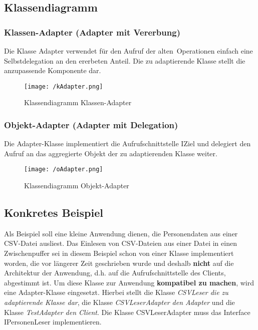 \documentclass[12pt,a4paper,titlepage]{article}
\theoremstyle{definition}
\begin{document}
\subsection{Klassendiagramm}
\subsubsection{Klassen-Adapter (Adapter mit Vererbung)}
Die Klasse Adapter verwendet für den Aufruf der \glqq alten\grqq ~Operationen einfach eine Selbstdelegation an den ererbeten Anteil.
Die zu adaptierende Klasse stellt die anzupassende Komponente dar.
\begin{figure}[htbp]
	\begin{center}
	\texttt{[image: /kAdapter.png]}
	
	\caption{Klassendiagramm Klassen-Adapter}
	\label{default}
	\end{center}
\end{figure}
\subsubsection{Objekt-Adapter (Adapter mit Delegation)}
Die Adapter-Klasse implementiert die Aufrufschnittstelle IZiel und delegiert den Aufruf an das 
aggregierte Objekt der zu adaptierenden Klasse weiter.
\begin{figure}[htbp]
	\begin{center}
	\texttt{[image: /oAdapter.png]}
	
	\caption{Klassendiagramm Objekt-Adapter}
	\label{default}
	\end{center}
\end{figure}

\subsection{Konkretes Beispiel}
Als Beispiel soll eine kleine Anwendung dienen, die Personendaten aus einer CSV-Datei ausliest.
Das Einlesen von CSV-Dateien aus einer Datei in einen Zwischenpuffer sei in diesem Beispiel schon von einer
Klasse implementiert worden, die vor längerer Zeit geschrieben wurde und deshalb \textbf{nicht} 
auf die Architektur der Anwendung, d.h. auf die Aufrufschnittstelle des Clients, abgestimmt ist.
Um diese Klasse zur Anwendung \textbf{kompatibel zu machen}, wird eine Adapter-Klasse eingesetzt.
\newline
\newline
Hierbei stellt die Klasse \textit{CSVLeser die zu adaptierende Klasse dar}, die Klasse \textit{CSVLeserAdapter den Adapter}
und die Klasse \textit{TestAdapter den Client}. Die Klasse CSVLeserAdapter muss das Interface IPersonenLeser implementieren.
\end{document}
